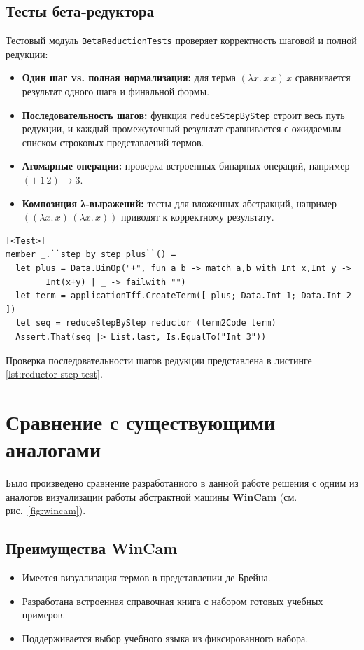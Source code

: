 \begin{itemize}
\subsection{Тесты бета‑редуктора}

Тестовый модуль \texttt{BetaReductionTests} проверяет корректность шаговой и полной редукции:

\begin{itemize}
  \item \textbf{Один шаг vs. полная нормализация:} для терма \((\lambda x.\,x\,x)\,x\) сравнивается результат одного шага и финальной формы.  
  \item \textbf{Последовательность шагов:} функция \texttt{reduceStepByStep} строит весь путь редукции, и каждый промежуточный результат сравнивается с ожидаемым списком строковых представлений термов.  
  \item \textbf{Атомарные операции:} проверка встроенных бинарных операций, например \((+\,1\,2)\to 3\).  
  \item \textbf{Композиция λ‑выражений:} тесты для вложенных абстракций, например \(((\lambda x.\,x)\,(\lambda x.\,x))\) приводят к корректному результату.  
\end{itemize}

\begin{lstlisting}[float=tb,frame=lines,label=lst:reductor-step-test,caption={Проверка последовательности шагов редукции}]
[<Test>]
member _.``step by step plus``() =
  let plus = Data.BinOp("+", fun a b -> match a,b with Int x,Int y -> 
        Int(x+y) | _ -> failwith "")
  let term = applicationTff.CreateTerm([ plus; Data.Int 1; Data.Int 2 ])
  let seq = reduceStepByStep reductor (term2Code term)
  Assert.That(seq |> List.last, Is.EqualTo("Int 3"))
\end{lstlisting}

Проверка последовательности шагов редукции представлена в листинге \ref{lst:reductor-step-test}.

\section{Сравнение с существующими аналогами}
\label{sec:comparison-analogs}

Было произведено сравнение разработанного в данной работе решения с одним из аналогов визуализации работы абстрактной машины \textbf{WinCam} (см. рис.~\ref{fig:wincam}).


\subsection*{Преимущества WinCam}
\begin{itemize}
  \item Имеется визуализация термов в представлении де Брейна.
  \item Разработана встроенная справочная книга с набором готовых учебных примеров.
  \item Поддерживается выбор учебного языка из фиксированного набора.
\end{itemize}


\end{itemize}
